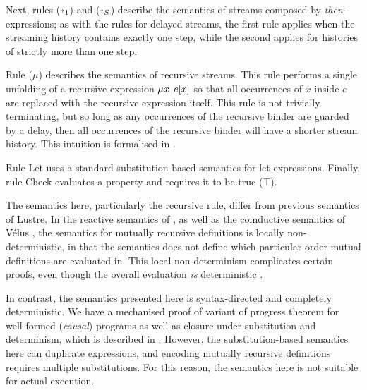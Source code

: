 \documentclass[sigplan,screen]{acmart}
\begin{document}
Next, rules ($\xthenarrow_1$) and ($\xthenarrow_S$) describe the semantics of streams composed by \emph{then}-expressions; as with the rules for delayed streams, the first rule applies when the streaming history contains exactly one step, while the second applies for histories of strictly more than one step.

Rule ($\mu{}$) describes the semantics of recursive streams.
This rule performs a single unfolding of a recursive expression $\mu{} x \!.~e[x]$ so that all occurrences of $x$ inside $e$ are replaced with the recursive expression itself.
This rule is not trivially terminating, but so long as any occurrences of the recursive binder are guarded by a delay, then all occurrences of the recursive binder will have a shorter stream history.
This intuition is formalised in \REF{}.

Rule Let uses a standard substitution-based semantics for let-expressions.
Finally, rule Check evaluates a property and requires it to be true ($\top$).

The semantics here, particularly the recursive rule, differ from previous semantics of Lustre.
In the reactive semantics of , as well as the coinductive semantics of Vélus , the semantics for mutually recursive definitions is locally non-deterministic, in that the semantics does not define which particular order mutual definitions are evaluated in.
This local non-determinism complicates certain proofs, even though the overall evaluation \emph{is} deterministic .

In contrast, the semantics presented here is syntax-directed and completely deterministic.
We have a mechanised proof of variant of progress theorem for well-formed (\emph{causal}) programs as well as closure under substitution and determinism, which is described in \REF.
However, the substitution-based semantics here can duplicate expressions, and encoding mutually recursive definitions requires multiple substitutions.
For this reason, the semantics here is not suitable for actual execution.

\pagebreak





\end{document}
